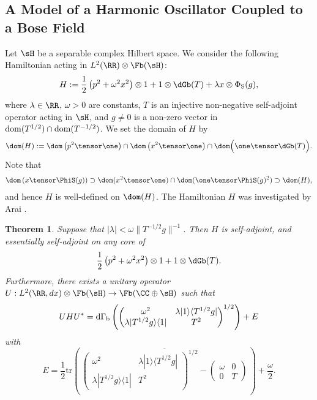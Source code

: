 \documentclass[12pt]{article}
\theoremstyle{plain}
\newtheorem{theorem}{Theorem}[section]
\numberwithin{equation}{section}
\theoremstyle{remark}
\begin{document}
\subsection{A Model of  a Harmonic Oscillator Coupled to a Bose Field}\label{ho+bose}
Let $\sH$ be a separable complex Hilbert space.
We consider the following Hamiltonian acting in $L^2(\RR)\otimes\Fb(\sH)$:
\[
H:=\frac{1}{2}\left(p^2+\omega^2 x^2\right)\otimes1 +1\otimes \dGb(T) + \lambda x\otimes\Phi_{\rm S}(g),
\]
where $\lambda\in\RR$, $\omega>0$ are constants, $T$ is an injective non-negative self-adjoint operator acting in $\sH$,
and $g\not=0$ is a non-zero vector in ${\rm dom}(T^{1/2})\cap{\rm dom}(T^{-1/2})$.
We set the domain of $H$ by
\begin{align}
 \dom(H) 
 := \dom\left(p^2\tensor\one\right) 
  \cap \dom\left(x^2\tensor \one\right)
  \cap \dom\Big( \one\tensor \dGb(T)\Big).  \label{dom of arai}
\end{align}
Note that
\begin{align*}
  \dom\left(x\tensor\PhiS(g)\right) \supset \dom(x^2\tensor\one)\cap\dom(\one\tensor\PhiS(g)^2) \supset \dom(H),
\end{align*}
and hence $H$ is well-defined on $\dom(H)$.
The Hamiltonian $H$ was investigated by Arai \cite{Ar81}.

\begin{theorem}\label{ho+boson diag}
Suppose that $|\lambda|<\omega\|T^{-1/2}g\|^{-1}$.
Then $H$ is self-adjoint, and essentially self-adjoint on any core of
\[
\frac{1}{2}\left(p^2+\omega^2 x^2\right)\otimes1 +1\otimes \dGb(T).
\]
Furthermore, there exists a unitary operator 
$U:L^2(\RR,dx)\otimes\Fb(\sH)\to\Fb(\CC\oplus\sH)$ such that 
\[
UHU^*={\rm d}\Gamma_{\rm b}\left(\begin{pmatrix}
\omega^2 & \lambda|1\rangle\langle T^{1/2}g| \\
\lambda |T^{1/2}g\rangle\langle 1| & T^2
\end{pmatrix}^{1/2}\right) + E
\]
with
\[
E=\frac{1}{2}\mathrm{tr}\left(\,\overline{\begin{pmatrix}
\omega^2 & \lambda|1\rangle\langle T^{1/2}g| \\
\lambda |T^{1/2}g\rangle\langle 1| & T^2
\end{pmatrix}^{1/2}
-\begin{pmatrix}
\omega & 0 \\
0 & T
\end{pmatrix}}\,\right)+\frac{\omega}{2}.
\]
\end{theorem}
\end{document}
